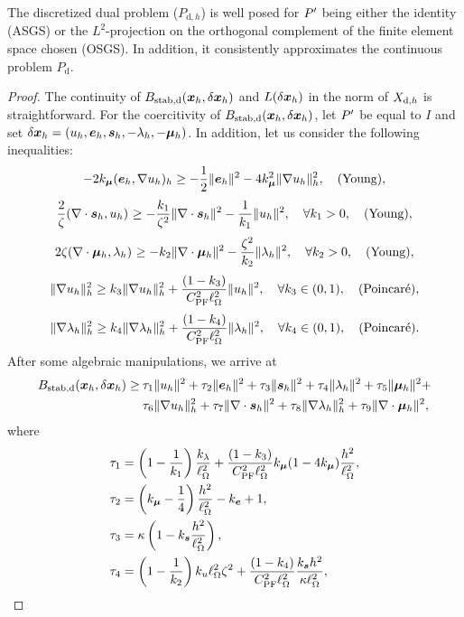 \begin{theorem}
The discretized dual problem ($P_{\mathrm{d},h}$) is well posed for $\Pt$ being either the identity (ASGS) or the $L^2$-projection on the orthogonal complement of the finite element space chosen (OSGS). In addition, it consistently approximates the continuous problem $P_{\mathrm{d}}$.      
\end{theorem}

\begin{proof}
The continuity of $B_\mathrm{stab,d}(\xFh,\delta \xFh)$ and $L(\delta\xFh)$ in the norm of $\XSdh$ is straightforward. For the coercitivity of $\Bsd(\xFh,\delta\xFh)$,
let $\Pt$ be equal to $I$ and set 
$\delta \xFh = (\uFh,\eFh,\sFh,-\lFh,-\mFh)$.
In addition, let us consider the following inequalities:
$$-2 \km \iprod[h]{\eFh}{\nabla\uFh} \geq -\frac12\norm[]{\eFh}^2-4 \km^2\norm[h]{\nabla\uFh}^2, \quad\text{(Young)}, $$
%
$$\frac{2}{\zeta}\iprod[]{\nabla\cdot\sFh}{\uFh} \geq -\frac{\kYus}{\zeta^2}\norm[]{\nabla\cdot\sFh}^2-\frac{1}{\kYus}\norm[]{\uFh}^2,\quad\forall\kYus > 0,\quad\text{(Young)},$$
%
$$2\zeta\iprod[]{\nabla\cdot\mFh}{\lFh} \geq -\kYlm\norm[]{\nabla\cdot\mFh}^2-\frac{\zeta^2}{\kYlm}\norm[]{\lFh}^2,\quad\forall\kYlm > 0,\quad\text{(Young)},$$
%
$$\norm[h]{\nabla\uFh}^2 \geq \kPu\norm[h]{\nabla\uFh}^2+\frac{(1-\kPu)}{\CPF^2\length^2}\norm[]{\uFh}^2,\quad\forall\kPu\in(0,1),\quad\text{(Poincaré)},$$
%
$$\norm[h]{\nabla\lFh}^2 \geq \kPl\norm[h]{\nabla\lFh}^2+\frac{(1-\kPl)}{\CPF^2\length^2}\norm[]{\lFh}^2,\quad\forall\kPl\in(0,1),\quad\text{(Poincaré)}.$$
After some algebraic manipulations, we arrive at
\begin{align*}
\Bsd(\xFh,\delta \xFh) \geq 
&\: \ttu\norm[]{\uFh}^2+
    \tte\norm[]{\eFh}^2+
    \tts\norm[]{\sFh}^2+
    \ttl\norm[]{\lFh}^2+
    \ttm\norm[]{\mFh}^2+
    \\    
&\: \ttdu\norm[h]{\nabla\uFh}^2+
    \ttds\norm[]{\nabla\cdot\sFh}^2+ 
    \ttdl\norm[h]{\nabla\lFh}^2+
    \ttdm\norm[]{\nabla\cdot\mFh}^2,
\end{align*}
where
\begin{align*}
    \ttu&= \left(1-\frac{1}{\kYus}\right)\frac{\kl}{\length^2}+\frac{(1-\kPu)}{\CPF^2\length^2}\km(1-4\km)\frac{h^2}{\length^2},\\
    \tte &= \left(\km-\frac14\right)\frac{h^2}{\length^2}
    -\ke+1,\\
    \tts &= \kappa\left(1-\ks\frac{h^2}{\length^2}\right),\\
    \ttl &= \left(1-\frac{1}{\kYlm}\right)\ku\length^2\zeta^2+\frac{(1-\kPl)}{\CPF^2\length^2}\frac{\ks h^2}{\kappa\length^2},\\

\end{align*}
\end{proof}
